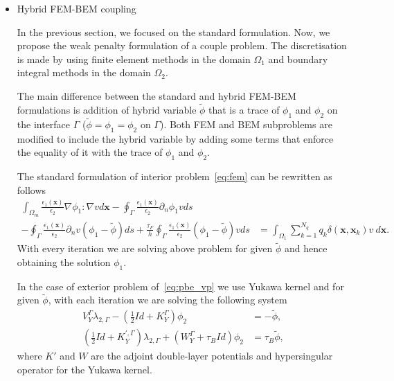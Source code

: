 \begin{itemize}
    \item Hybrid FEM-BEM coupling
    
  In the previous section, we focused on the standard formulation. Now, we propose the weak penalty formulation of a couple problem. The discretisation is made by using finite element methods in the domain $\Omega_1$ and boundary integral methods in the domain $\Omega_2$.
  
    The main difference between the standard and hybrid FEM-BEM formulations is addition of hybrid variable $\widetilde{\phi}$ that is a trace of $\phi_1$ and $\phi_2$ on the interface $\Gamma$ ($\widetilde{\phi} = \phi_1 = \phi_2$ on  $\Gamma$). Both FEM and BEM subproblems are modified to include the hybrid variable by adding some terms that enforce the equality of it with the trace of $\phi_1$ and $\phi_2$.
    
    The standard formulation of interior problem~\eqref{eq:fem} can be rewritten as follows
\begin{align*}
 \int_{\Omega_m} \frac{\epsilon_1(\mathbf{x})}{\epsilon_2} \nabla \phi_1 : \nabla v d\mathbf{x} -  \oint_\Gamma \frac{\epsilon_1(\mathbf{x})}{\epsilon_2}  \partial_n \phi_1 v ds
  & \\
 -  \oint_\Gamma \frac{\epsilon_1(\mathbf{x})}{\epsilon_2} \partial_n v (\phi_1 - \widetilde{\phi}) ds
  + \tfrac{\tau_F}{h} \oint_\Gamma \frac{\epsilon_1(\mathbf{x})}{\epsilon_2} (\phi_1 - \widetilde{\phi}) v ds & = \int_{\Omega_1}  \sum_{k=1}^{N_q} q_k\delta(\mathbf{x},\mathbf{x}_k)   v ~d\mathbf{x}.
\end{align*}
With every iteration we are solving above problem for given $\widetilde{\phi}$ and hence obtaining the solution $ \phi_1$.

In the case of exterior problem of~\eqref{eq:pbe_vp} we use Yukawa kernel and 
for given $\widetilde{\phi}$, with each iteration we are solving the following system
\begin{align*}
V_{Y}^{\Gamma} \lambda_{2,\Gamma}  - \left( \tfrac{1}{2}Id + K_{Y}^{\Gamma}  \right) \phi_2 &= - \widetilde{\phi},  \\
 \left( \tfrac{1}{2} Id +  K_{Y}^{',\Gamma}\right)  \lambda_{2,\Gamma} + \left(W_{Y}^{\Gamma} + \tau_B Id\right)  \phi_2  &= \tau_B \widetilde{\phi},
\end{align*}
where $K'$ and $W$ are the adjoint double-layer potentials and hypersingular operator for the Yukawa kernel.


\end{itemize}

